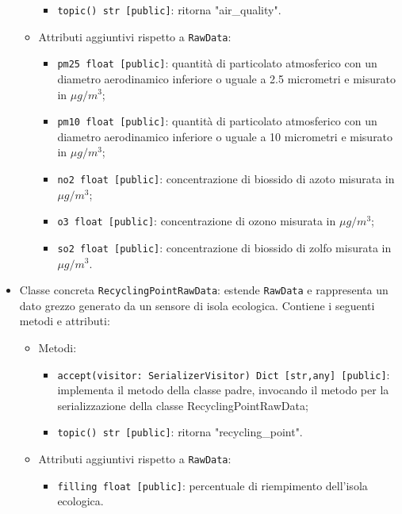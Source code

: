 \begin{itemize}
\begin{itemize}
\begin{itemize}
			            \item \texttt{topic() str [public]}: ritorna "air\_quality".
		            \end{itemize}
		      \item Attributi aggiuntivi rispetto a \texttt{RawData}:
		            \begin{itemize}
			            \item \texttt{pm25 float [public]}: quantità di particolato atmosferico con un diametro aerodinamico inferiore o uguale a 2.5 micrometri e misurato in $\mu g/m^3$;
			            \item \texttt{pm10 float [public]}: quantità di particolato atmosferico con un diametro aerodinamico inferiore o uguale a 10 micrometri e misurato in $\mu g/m^3$;
			            \item \texttt{no2 float [public]}: concentrazione di biossido di azoto misurata in $\mu g/m^3$;
			            \item \texttt{o3 float [public]}: concentrazione di ozono misurata in $\mu g/m^3$;
			            \item \texttt{so2 float [public]}: concentrazione di biossido di zolfo misurata in $\mu g/m^3$.
		            \end{itemize}
	      \end{itemize}
	\item Classe concreta \texttt{RecyclingPointRawData}: estende \texttt{RawData} e rappresenta un dato grezzo generato da un sensore di isola ecologica. Contiene i seguenti metodi e attributi:
	      \begin{itemize}
		      \item Metodi:
		            \begin{itemize}
			            \item \texttt{accept(visitor: SerializerVisitor) Dict [str,any] [public]}: implementa il metodo della classe padre, invocando il metodo per la serializzazione della classe RecyclingPointRawData;
			            \item \texttt{topic() str [public]}: ritorna "recycling\_point".
		            \end{itemize}
		      \item Attributi aggiuntivi rispetto a \texttt{RawData}:
		            \begin{itemize}
			            \item \texttt{filling float [public]}: percentuale di riempimento dell'isola ecologica.
		            \end{itemize}

\end{itemize}
\end{itemize}
